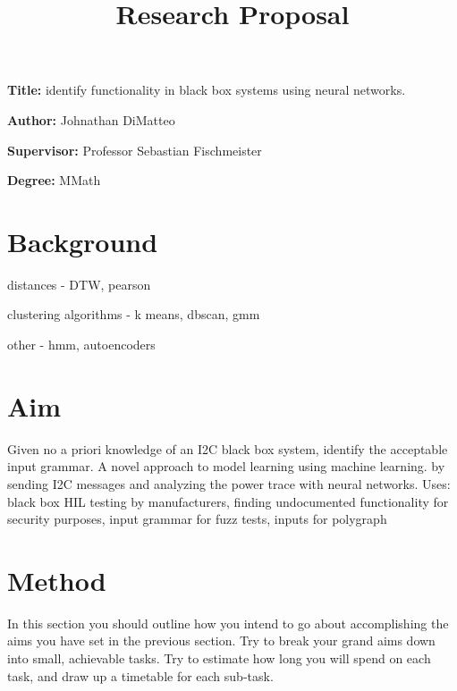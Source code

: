 \documentclass[12pt, a4paper]{article}
\title{Research Proposal}
\author{}
\date{}
\newcommand{\namelistlabel}[1]{\mbox{#1}\hfil}
\newenvironment{namelist}[1]{%
\begin{list}{}
    {
        \let\makelabel\namelistlabel
        \settowidth{\labelwidth}{#1}
        \setlength{\leftmargin}{1.1\labelwidth}
    }
  }{%
\end{list}}
\begin{document}
\maketitle

\begin{namelist}{xxxxxxxxxxxx}
\item[{\bf Title:}]
	identify functionality in black box systems using neural networks.
\item[{\bf Author:}]
	Johnathan DiMatteo
\item[{\bf Supervisor:}]
	Professor Sebastian Fischmeister
\item[{\bf Degree:}]
	MMath
\end{namelist}

\section*{Background} 
distances - DTW, pearson

clustering algorithms - k means, dbscan, gmm

other - hmm, autoencoders

\section*{Aim} 

Given no a priori knowledge of an I2C black box system, identify the acceptable input grammar. 
A novel approach to model learning using machine learning.
by sending I2C messages and analyzing the power trace with neural networks.
Uses: black box HIL testing by manufacturers, finding undocumented functionality for security purposes, input grammar for fuzz tests, inputs for polygraph

\section*{Method}
In this section you should outline how you intend to go
about accomplishing the aims you have set in the previous
section. Try to break your grand aims down into small,
achievable tasks. Try to estimate how long you will
spend on each task, and draw up a timetable for each
sub-task.
\end{document}
